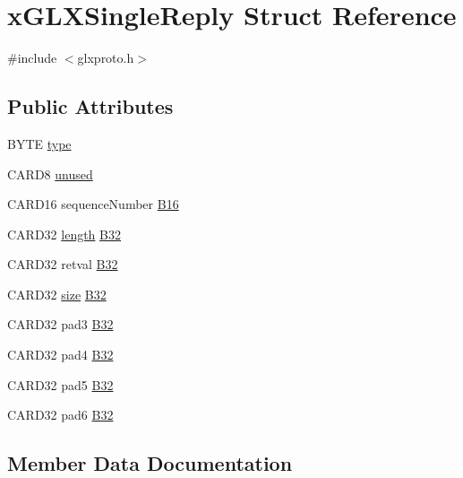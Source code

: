 \hypertarget{structx_g_l_x_single_reply}{}\section{x\+G\+L\+X\+Single\+Reply Struct Reference}
\label{structx_g_l_x_single_reply}


{\ttfamily \#include $<$glxproto.\+h$>$}

\subsection*{Public Attributes}
\begin{DoxyCompactItemize}
\item 
B\+Y\+TE \hyperlink{structx_g_l_x_single_reply_a6dff30be707f44f66002a5ad4484351f}{type}
\item 
C\+A\+R\+D8 \hyperlink{structx_g_l_x_single_reply_a84b2a531e635ac81d9625cd448cb6ed4}{unused}
\item 
C\+A\+R\+D16 sequence\+Number \hyperlink{structx_g_l_x_single_reply_ad0a77c13ed83e75947b331e7fedcbe08}{B16}
\item 
C\+A\+R\+D32 \hyperlink{glcorearb_8h_ab9c919755bde3b34349e23a32b4e0fa7}{length} \hyperlink{structx_g_l_x_single_reply_a5e23d0329fa299d32cd16d2dc27e1e94}{B32}
\item 
C\+A\+R\+D32 retval \hyperlink{structx_g_l_x_single_reply_a6cb8890ab16da0b5a06ffa78678213b6}{B32}
\item 
C\+A\+R\+D32 \hyperlink{glcorearb_8h_a3d1e3edfcf61ca2d831883e1afbad89e}{size} \hyperlink{structx_g_l_x_single_reply_a02a6e905adbec3807fb503c98397da2d}{B32}
\item 
C\+A\+R\+D32 pad3 \hyperlink{structx_g_l_x_single_reply_ae5f00fccb5e1167e8955efdc0a0e9114}{B32}
\item 
C\+A\+R\+D32 pad4 \hyperlink{structx_g_l_x_single_reply_a78719790bc436cd28f529d044faccb93}{B32}
\item 
C\+A\+R\+D32 pad5 \hyperlink{structx_g_l_x_single_reply_a62969bbe95a637c499d489d8fb4319c0}{B32}
\item 
C\+A\+R\+D32 pad6 \hyperlink{structx_g_l_x_single_reply_af671c213cb3b970e401a19ff169e1033}{B32}
\end{DoxyCompactItemize}


\subsection{Member Data Documentation}
\mbox{\label{structx_g_l_x_single_reply_ad0a77c13ed83e75947b331e7fedcbe08}} 
